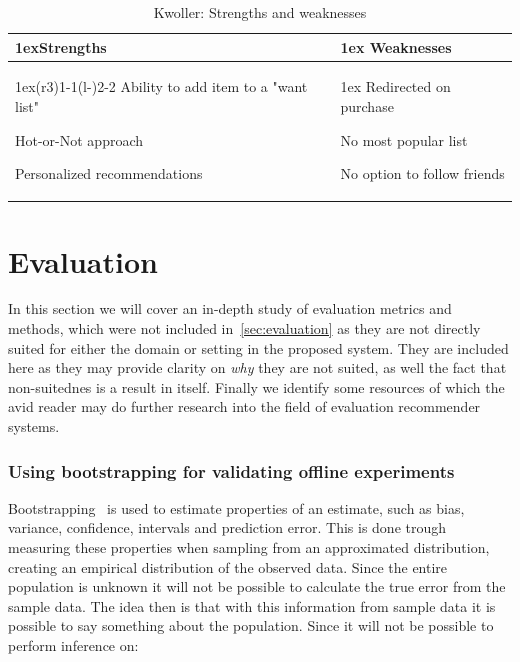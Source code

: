 \begin{table}[H]
    \centering
    \begin{tabularx}{\linewidth}{>{\parskip1ex}X@{\kern4\tabcolsep}>{\parskip1ex}X}
        \toprule
        \hfil\bfseries Strengths
        &
        \hfil\bfseries Weaknesses
        \\\cmidrule(r{3\tabcolsep}){1-1}\cmidrule(l{-\tabcolsep}){2-2}
        Ability to add item to a "want list" \par
        Hot-or-Not approach \par
        Personalized recommendations \par
        &
        Redirected on purchase \par
        No most popular list \par
        No option to follow friends \par
        \\\bottomrule
    \end{tabularx}
    \caption{Kwoller: Strengths and weaknesses}
    \label{table:ecommerceKwoller}
\end{table}


\section{Evaluation}
\label{appendix:evaluation-metrics}

In this section we will cover an in-depth study of evaluation metrics and
methods, which were not included in~\ref{sec:evaluation} as they are not
directly suited for either the domain or setting in the proposed system.
They are included here as they may provide clarity on \textit{why} they are not
suited, as well the fact that non-suitednes is a result in itself. Finally we
identify some resources of which the avid reader may do further research into
the field of evaluation recommender systems.

\subsubsection{Using bootstrapping for validating offline experiments}
Bootstrapping~\cite{efron1994introduction} is used to estimate properties of an
estimate, such as bias, variance, confidence, intervals and prediction error.
This is done trough measuring these properties when sampling from an
approximated distribution, creating an empirical distribution of the observed
data.  Since the entire population is unknown it will not be possible to
calculate the true error from the sample data.  The idea then is that with this
information from sample data it is possible to say something about the
population.  Since it will not be possible to perform inference on:

